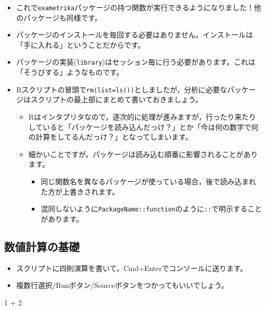 \documentclass[
  a4paper,
]{ltjsbook}
\newenvironment{Shaded}{\begin{snugshade}}{\end{snugshade}}
\newcommand{\DecValTok}[1]{\textcolor[rgb]{0.68,0.00,0.00}{#1}}
\newcommand{\SpecialCharTok}[1]{\textcolor[rgb]{0.37,0.37,0.37}{#1}}
\providecommand{\tightlist}{%
  \setlength{\itemsep}{0pt}\setlength{\parskip}{0pt}}\usepackage{longtable,booktabs,array}
\begin{document}
\begin{itemize}
\item
  これで\texttt{exametrika}パッケージの持つ関数が実行できるようになりました！他のパッケージも同様です。
\item
  パッケージのインストールを毎回する必要はありません。インストールは「手に入れる」ということだからです。
\item
  パッケージの実装(\texttt{library})はセッション毎に行う必要があります。これは「そうびする」ようなものです。
\item
  Rスクリプトの冒頭で\texttt{rm(list=ls())}としましたが，分析に必要なパッケージはスクリプトの最上部にまとめて書いておきましょう。

  \begin{itemize}
  \tightlist
  \item
    Rはインタプリタなので，逐次的に処理が進みますが，行ったり来たりしていると「パッケージを読み込んだっけ？」とか「今は何の数字で何の計算をしてるんだっけ？」となってしまいます。
  \item
    細かいことですが，パッケージは読み込む順番に影響されることがあります。

    \begin{itemize}
    \tightlist
    \item
      同じ関数名を異なるパッケージが使っている場合，後で読み込まれた方が上書きされます。
    \item
      混同しないように\texttt{PackageName::function}のように\texttt{::}で明示することがあります。
    \end{itemize}
  \end{itemize}
\end{itemize}

\subsection{数値計算の基礎}\label{ux6570ux5024ux8a08ux7b97ux306eux57faux790e}

\begin{itemize}
\tightlist
\item
  スクリプトに四則演算を書いて，Cmd+Enterでコンソールに送ります。
\item
  複数行選択/Runボタン/Sourceボタンをつかってもいいでしょう。
\end{itemize}

\begin{Shaded}
\begin{Highlighting}[]
\DecValTok{1} \SpecialCharTok{+} \DecValTok{2}
\end{Highlighting}
\end{Shaded}
\end{document}
